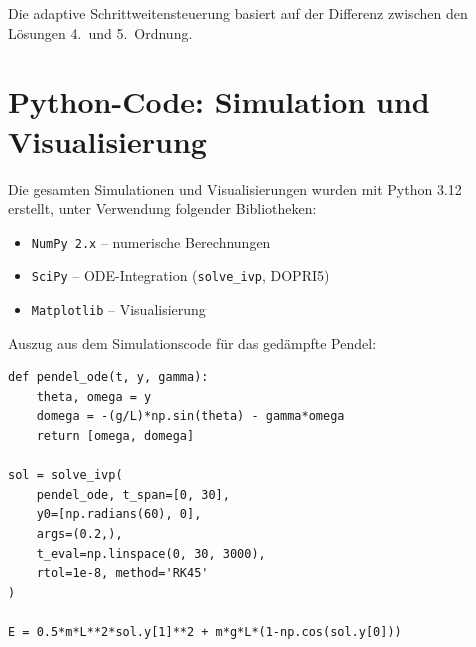 ﻿\documentclass[12pt, a4paper]{report}
\theoremstyle{definition}
\theoremstyle{remark}
\begin{document}
Die adaptive Schrittweitensteuerung basiert auf der Differenz zwischen den
Lösungen 4.\ und 5.\ Ordnung.

\chapter{Python-Code: Simulation und Visualisierung}
\label{app:code}

Die gesamten Simulationen und Visualisierungen wurden mit Python 3.12 erstellt,
unter Verwendung folgender Bibliotheken:

\begin{itemize}
  \item \texttt{NumPy 2.x} -- numerische Berechnungen
  \item \texttt{SciPy} -- ODE-Integration (\texttt{solve\_ivp}, DOPRI5)
  \item \texttt{Matplotlib} -- Visualisierung
\end{itemize}

Auszug aus dem Simulationscode für das gedämpfte Pendel:

\begin{verbatim}
def pendel_ode(t, y, gamma):
    theta, omega = y
    domega = -(g/L)*np.sin(theta) - gamma*omega
    return [omega, domega]

sol = solve_ivp(
    pendel_ode, t_span=[0, 30],
    y0=[np.radians(60), 0],
    args=(0.2,),
    t_eval=np.linspace(0, 30, 3000),
    rtol=1e-8, method='RK45'
)

E = 0.5*m*L**2*sol.y[1]**2 + m*g*L*(1-np.cos(sol.y[0]))
\end{verbatim}
\end{document}
